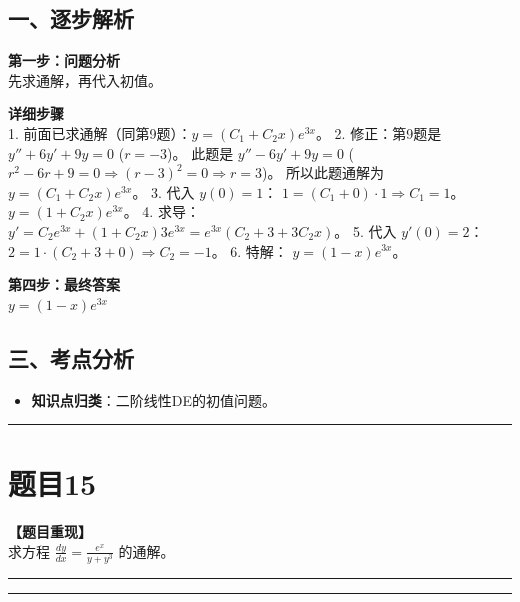 \documentclass[12pt, a4paper]{ctexart}
\newcommand{\TopSeparator}{
    \par\noindent\rule{\textwidth}{1.5pt}\vspace{0.5em} %
}
\newcommand{\AnalysisSeparator}{
    \par\noindent\rule{\textwidth}{0.5pt}\vspace{0.2em}\hrule\vspace{0.5em} %
}
\newenvironment{RedAnalysis}{
    \par
    \color{red} %
}{
    \par
    \color{black} %
}
\begin{document}
\begin{RedAnalysis}

\subsection*{一、逐步解析}

\textbf{第一步：问题分析} \\
先求通解，再代入初值。

\textbf{详细步骤} \\
1. 前面已求通解（同第9题）：$y = (C_1 + C_2 x)e^{3x}$。
2. 修正：第9题是 $y''+6y'+9y=0$ ($r=-3$)。
   此题是 $y''-6y'+9y=0$ ($r^2-6r+9=0 \Rightarrow (r-3)^2=0 \Rightarrow r=3$)。
   所以此题通解为 $y = (C_1 + C_2 x)e^{3x}$。
3. 代入 $y(0)=1$：
   $1 = (C_1 + 0) \cdot 1 \Rightarrow C_1 = 1$。
   $y = (1 + C_2 x)e^{3x}$。
4. 求导：
   $y' = C_2 e^{3x} + (1 + C_2 x) 3e^{3x} = e^{3x} (C_2 + 3 + 3C_2 x)$。
5. 代入 $y'(0)=2$：
   $2 = 1 \cdot (C_2 + 3 + 0) \Rightarrow C_2 = -1$。
6. 特解：
   $y = (1 - x)e^{3x}$。

\textbf{第四步：最终答案} \\
$ y = (1 - x)e^{3x} $

\subsection*{三、考点分析}
\begin{itemize}
    \item \textbf{知识点归类}：二阶线性DE的初值问题。
\end{itemize}

\end{RedAnalysis}

\vspace{2em}

\TopSeparator
\section*{题目15}

\textbf{【题目重现】} \\
求方程 $ \frac{dy}{dx}=\frac{e^{x}}{y+y^{3}} $ 的通解。

\AnalysisSeparator
\end{document}
